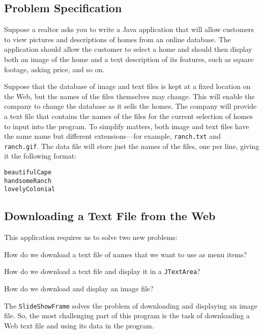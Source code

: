{\subsection*{Problem Specification}
\noindent Suppose a realtor asks you to write a Java application that will
allow customers to view pictures and descriptions of homes from
an online database.   The application should allow the customer to
select a home and should then display both an image of the home and a
text description of its features, such as square footage, asking
price, and so on.

Suppose that the database of image and text files is kept at a fixed
location on the Web, but the names of the files themselves may change.
This will enable the company to change the database as it sells the
homes.  The company will provide a text file that contains the names
of the files for the current selection of homes to input into the
program.  To simplify matters, both image and text files have the same
name but different extensions---for example, {\tt ranch.txt} and {\tt
ranch.gif}.  The data file will store just the names of the files, one
per line, giving it the following format:

\begin{jjjlisting}
\begin{lstlisting}
beautifulCape
handsomeRanch
lovelyColonial
\end{lstlisting}
\end{jjjlisting}

\subsection{Downloading a Text File from the Web}
\noindent This application requires us to solve two new problems:

\begin{NL}
\item  How do we download a text file of names that we want to use as
menu items?
\item  How do we download a text file and display it in a {\tt JTextArea}?
\item  How do we download and display an image file?
\end{NL}

\noindent The {\tt SlideShowFrame} solves the problem of downloading and displaying an image file.   So, the most challenging part of this program is the task of
downloading a Web text file and using its data in the program.

}

